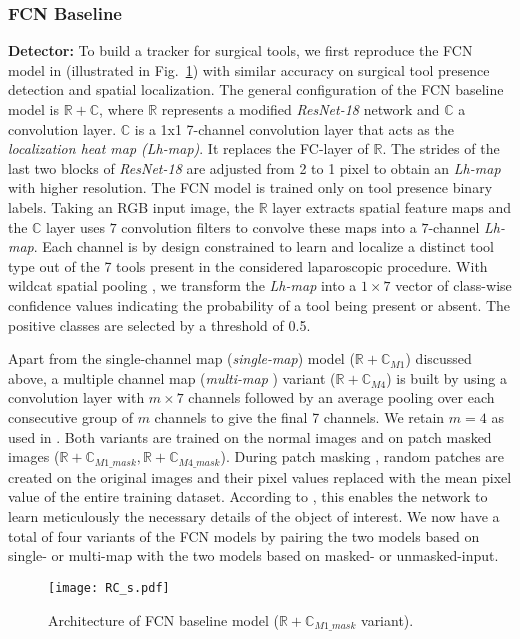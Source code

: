 \documentclass{svjour3}                     \smartqed
\newcommand{\bd}[1]{\textbf{#1}}
\begin{document}
\subsubsection{FCN Baseline}\label{sec:baseline_fcn_model}
\bd{Detector: }
To build a tracker for surgical tools, we first reproduce the FCN model in \cite{miccai:vardazaryan2018weakly} (illustrated in Fig.~\ref{fig:fcn_baseline}) with similar accuracy on surgical tool presence detection and spatial localization. 
The general configuration of the FCN baseline model is $\mathbb{R+C}$, where $\mathbb{R}$ represents a modified \textit{ResNet-18} network and $\mathbb{C}$ a convolution layer. 
$\mathbb{C}$ is a 1x1 7-channel convolution layer that acts as the \textit{localization heat map (Lh-map)}. 
It replaces the FC-layer of $\mathbb{R}$. The strides of the last two blocks of \textit{ResNet-18} are adjusted from 2 to 1 pixel to obtain an \emph{Lh-map} with higher resolution.
The FCN model is trained only on tool presence binary labels.
Taking an RGB input image, the $\mathbb{R}$ layer extracts spatial feature maps and the $\mathbb{C}$ layer uses $7$ convolution filters to convolve these maps into a $7$-channel \emph{Lh-map}.
Each channel is by design constrained to learn and localize a distinct tool type out of the 7 tools present in the considered laparoscopic procedure.
With wildcat spatial pooling \cite{cvpr:durand2017wildcat}, we transform the \emph{Lh-map} into a $1\times7$ vector of class-wise confidence values indicating the probability of a tool being present or absent. The positive classes are selected by a threshold of 0.5.

Apart from the single-channel map (\textit{single-map}) model (\textit{$\mathbb{R+C}_{M1}$}) discussed above, a multiple channel map (\textit{multi-map} \cite{cvpr:durand2017wildcat}) variant (\textit{$\mathbb{R+C}_{M4}$}) is built by using a convolution layer with \textit{$m\times7$} channels followed by an average pooling over each consecutive group of $m$ channels to give the final 7 channels. 
We retain \textit{$m=4$} as used in \cite{miccai:vardazaryan2018weakly}. 
Both variants are trained on the normal images and on patch masked images (\textit{$\mathbb{R+C}_{M1\_mask}, \mathbb{R+C}_{M4\_mask}$}). 
During patch masking \cite{iccv:singh2017hide}, random patches are created on the original images and their pixel values replaced with the mean pixel value of the entire training dataset. 
According to \cite{iccv:singh2017hide}, this enables the network to learn meticulously the necessary details of the object of interest. 
We now have a total of four variants of the FCN models by pairing the two models based on single- or multi-map with the two models based on masked- or unmasked-input.
\begin{figure}[t]\centering
        \texttt{[image: RC\_s.pdf]}
        \caption{Architecture of FCN baseline model ($\mathbb{R+C}_{M1\_mask}$ variant).}
    \label{fig:fcn_baseline}
\end{figure}
\end{document}
